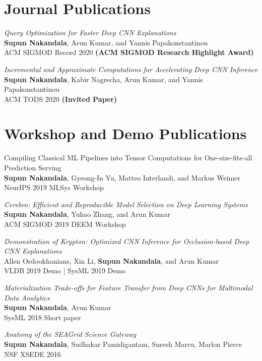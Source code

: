 \documentclass[margin]{res}
\begin{document}
\begin{resume}
\section{Journal Publications}
\par
\textit{Query Optimization for Faster Deep CNN Explanations} \\
\textbf{Supun Nakandala}, Arun Kumar, and Yannis Papakonstantinou\\
ACM SIGMOD Record 2020 \textbf{(ACM SIGMOD Research Highlight Award)}

\par
\textit{Incremental and Approximate Computations for Accelerating Deep CNN Inference} \\
\textbf{Supun Nakandala}, Kabir Nagrecha, Arun Kumar, and Yannis Papakonstantinou\\
ACM TODS 2020 \textbf{(Invited Paper)}


\section{Workshop and Demo Publications}
\par
Compiling Classical ML Pipelines into Tensor Computations for One-size-fits-all Prediction Serving \\
\textbf{Supun Nakandala}, Gyeong-In Yu, Matteo Interlandi, and Markus Weimer\\
NeurIPS 2019 MLSys Workshop

\par
\textit{Cerebro: Efficient and Reproducible Model Selection on Deep Learning Systems} \\
\textbf{Supun Nakandala}, Yuhao Zhang, and Arun Kumar\\
ACM SIGMOD 2019 DEEM Workshop

\par
\textit{Demonstration of Krypton: Optimized CNN Inference for Occlusion-based Deep CNN Explanations} \\
Allen Ordookhanians, Xin Li, \textbf{Supun Nakandala}, and Arun Kumar\\
VLDB 2019 Demo $|$ SysML 2019 Demo

\par
\textit{Materialization Trade-offs for Feature Transfer from Deep CNNs for Multimodal Data Analytics} \\
\textbf{Supun Nakandala}, Arun Kumar\\
SysML 2018 Short paper

\par
\textit{Anatomy of the SEAGrid Science Gateway} \\
\textbf{Supun Nakandala}, Sudhakar Pamidigantam, Suresh Marru, Marlon Pierce\\
NSF XSEDE 2016



\end{resume}
\end{document}
